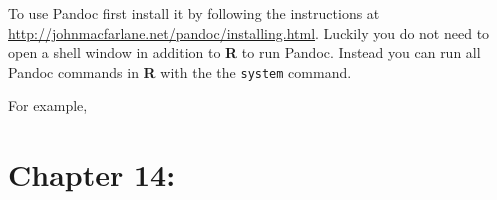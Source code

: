 \documentclass[ChapterTOCs,krantz1]{krantz}\usepackage{graphicx, color}
\begin{document}
To use Pandoc first install it by following the instructions at {\url{http://johnmacfarlane.net/pandoc/installing.html}}. Luckily you do not need to open a shell window in addition to {\bf{R}} to run Pandoc. Instead you can run all Pandoc commands in {\bf{R}} with the the {\tt{system}} command. 

For example, 


  




\chapter{Chapter 14:}






\clearpage
\printindex
\end{document}
